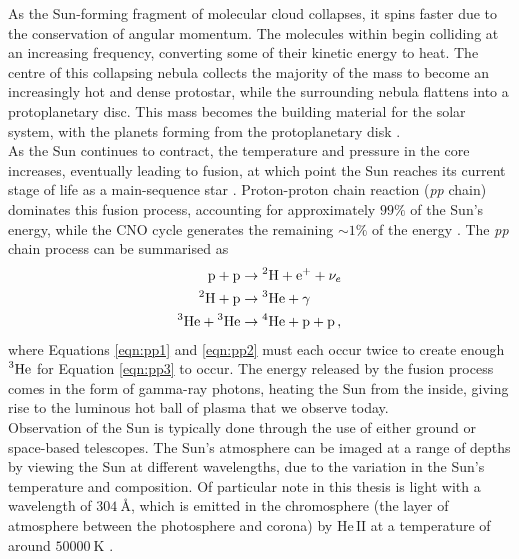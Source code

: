 \documentclass[11pt,a4paper,onecolumn]{report}
\newcommand*\chem[1]{\ensuremath{\mathrm{#1}}}
\begin{document}
As the Sun-forming fragment of molecular cloud collapses, it spins faster due to
the conservation of angular momentum. The molecules within begin colliding at an
increasing frequency, converting some of their kinetic energy to heat. The
centre of this collapsing nebula collects the majority of the mass to become an
increasingly hot and dense protostar, while the surrounding nebula flattens into
a protoplanetary disc. This mass becomes the building material for the solar
system, with the planets forming from the protoplanetary disk
\citep{greaves_disks_2005}. \\

As the Sun continues to contract, the temperature and pressure in the core
increases, eventually leading to fusion, at which point the Sun reaches its
current stage of life as a main-sequence star \citep{woolfson_origin_2000}.
Proton-proton chain reaction (\textit{pp} chain) dominates this fusion process,
accounting for approximately $99\%$ of the Sun's energy, while the CNO cycle
generates the remaining \(\sim 1\%\) of the energy \citep{adelberger_solar_2011}.
The \textit{pp} chain process can be summarised as
\begin{align}
  \chem{p} + \chem{p} &\rightarrow \chem{\prescript{2}{}H} + \chem{e^+} +
  \nu_e \label{eqn:pp1}\\
  \chem{\prescript{2}{}H} + \chem{p} &\rightarrow \chem{\prescript{3}{}He}
  + \gamma \label{eqn:pp2}\\
  \chem{\prescript{3}{}He} + \chem{\prescript{3}{}He} & \rightarrow
  \chem{\prescript{4}{}He} + \chem{p} + \chem{p}\,, \label{eqn:pp3}
\end{align}
where Equations \ref{eqn:pp1} and \ref{eqn:pp2} must each occur twice to create
enough $\chem{\prescript{3}{}He}$ for Equation \ref{eqn:pp3} to occur. The
energy released by the fusion process comes in the form of gamma-ray photons,
heating the Sun from the inside, giving rise to the luminous hot ball of plasma
that we observe today. \\


Observation of the Sun is typically done through the use of either ground or
space-based telescopes. The Sun's atmosphere can be imaged at a range of depths
by viewing the Sun at different wavelengths, due to the variation in the Sun's
temperature and composition. Of particular note in this thesis is light with a
wavelength of \(\SI{304}{\angstrom}\), which is emitted in the chromosphere (the
layer of atmosphere between the photosphere and corona) by \(\chem{He \, II}\)
at a temperature of around \(\SI{50000}{\kelvin}\)
\citep{herbert_friedman_solar_1962}. \\
\end{document}
